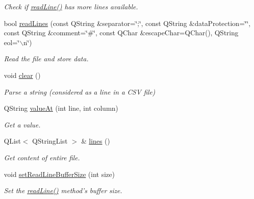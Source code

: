 \begin{DoxyCompactItemize}
\begin{DoxyCompactList}\small\item\em Check if \hyperlink{classmdt_csv_file_aa7d5e7ab9d6d71f7ca1c9fe7bea043a3}{readLine()} has more lines available. \end{DoxyCompactList}\item 
bool \hyperlink{classmdt_csv_file_adeb771789de28feb5c1ec326b179e83b}{readLines} (const QString \&separator=\char`\"{};\char`\"{}, const QString \&dataProtection=\char`\"{}\char`\"{}, const QString \&comment=\char`\"{}\#\char`\"{}, const QChar \&escapeChar=QChar(), QString eol=\char`\"{}$\backslash$n\char`\"{})
\begin{DoxyCompactList}\small\item\em Read the file and store data. \end{DoxyCompactList}\item 
void \hyperlink{classmdt_csv_file_afe815d4fbdc08c442c9b1dce447cda75}{clear} ()
\begin{DoxyCompactList}\small\item\em Parse a string (considered as a line in a CSV file) \end{DoxyCompactList}\item 
QString \hyperlink{classmdt_csv_file_af2d0917f92dd0d0d8100edccf1d3e4ee}{valueAt} (int line, int column)
\begin{DoxyCompactList}\small\item\em Get a value. \end{DoxyCompactList}\item 
\hypertarget{classmdt_csv_file_a089e82f55982a40587f3d9e53c7ff261}{
QList$<$ QStringList $>$ \& \hyperlink{classmdt_csv_file_a089e82f55982a40587f3d9e53c7ff261}{lines} ()}
\label{classmdt_csv_file_a089e82f55982a40587f3d9e53c7ff261}

\begin{DoxyCompactList}\small\item\em Get content of entire file. \end{DoxyCompactList}\item 
void \hyperlink{classmdt_csv_file_a27751812bf6625d6264bdce4bd43167c}{setReadLineBufferSize} (int size)
\begin{DoxyCompactList}\small\item\em Set the \hyperlink{classmdt_csv_file_aa7d5e7ab9d6d71f7ca1c9fe7bea043a3}{readLine()} method's buffer size. \end{DoxyCompactList}\end{DoxyCompactItemize}


